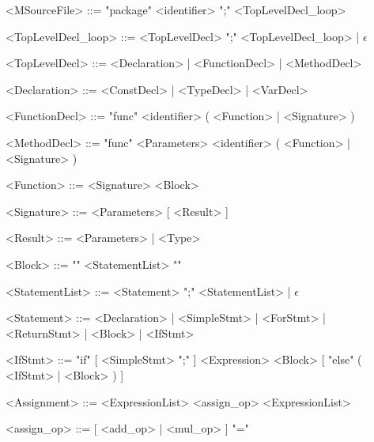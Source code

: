 \documentclass{article}
\begin{document}
    \begin{grammar}

        <MSourceFile>       ::=     "package" <identifier> ";" <TopLevelDecl_loop>
        
        <TopLevelDecl_loop> ::=     <TopLevelDecl> ";" <TopLevelDecl_loop> | $\epsilon$

        <TopLevelDecl>      ::=     <Declaration> | <FunctionDecl> | <MethodDecl>

        <Declaration>       ::=     <ConstDecl> | <TypeDecl> | <VarDecl>

        <FunctionDecl>      ::=     "func" <identifier> ( <Function> | <Signature> )

        <MethodDecl>        ::=     "func" <Parameters> <identifier> ( <Function> | <Signature> )

        <Function>          ::=     <Signature> <Block>

        <Signature>         ::=     <Parameters> [ <Result> ]

        <Result>            ::=     <Parameters> | <Type>

        <Block>             ::=     "{" <StatementList> "}"

        <StatementList>     ::=     <Statement> ";" <StatementList> | $\epsilon$

        <Statement>         ::=     <Declaration> | <SimpleStmt> | <ForStmt> | <ReturnStmt> | <Block> | <IfStmt>

        <IfStmt>            ::=     "if" [ <SimpleStmt> ";" ] <Expression> <Block> [ "else" ( <IfStmt> | <Block> ) ]

        <Assignment>        ::=     <ExpressionList> <assign_op> <ExpressionList>

        <assign_op>         ::=     [ <add_op> | <mul_op> ] "="


\end{grammar}
\end{document}

